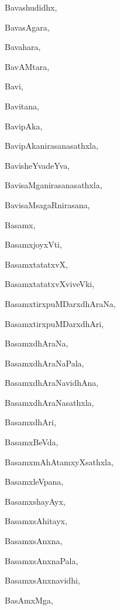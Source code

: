\begin{multicols}{2}
{Bavashudidhx}, \pageref{Bavashudidhx}

{BavasAgara}, \pageref{BavasAgara}

{Bavahara}, \pageref{Bavahara}

{BavAMtara}, \pageref{BavAMtara}

{Bavi}, \pageref{Bavi}

{Bavitana}, \pageref{Bavitana}

{BavipAka}, \pageref{BavipAka}

{BavipAkanirasanasathxla}, \pageref{BavipAkanirasanasathxla}

{BavisheYvadeYva}, \pageref{BavisheYvadeYva}

{BavisaMganirasanasathxla}, \pageref{BavisaMganirasanasathxla}

{BavisaMsagaRnirasana}, \pageref{BavisaMsagaRnirasana}

{Basamx}, \pageref{Basamx}

{BasamxjoyxVti}, \pageref{BasamxjoyxVti}

{BasamxtatatxvX}, \pageref{BasamxtatatxvX}

{BasamxtatatxvXviveVki}, \pageref{BasamxtatatxvXviveVki}

{BasamxtirxpuMDarxdhAraNa}, \pageref{BasamxtirxpuMDarxdhAraNa}

{BasamxtirxpuMDarxdhAri}, \pageref{BasamxtirxpuMDarxdhAri}

{BasamxdhAraNa}, \pageref{BasamxdhAraNa}

{BasamxdhAraNaPala}, \pageref{BasamxdhAraNaPala}

{BasamxdhAraNavidhAna}, \pageref{BasamxdhAraNavidhAna}

{BasamxdhAraNasathxla}, \pageref{BasamxdhAraNasathxla}

{BasamxdhAri}, \pageref{BasamxdhAri}

{BasamxBeVda}, \pageref{BasamxBeVda}

{BasamxmAhAtamxyXsathxla}, \pageref{BasamxmAhAtamxyXsathxla}

{BasamxleVpana}, \pageref{BasamxleVpana}

{BasamxshayAyx}, \pageref{BasamxshayAyx}

{BasamxsAhitayx}, \pageref{BasamxsAhitayx}

{BasamxsAnxna}, \pageref{BasamxsAnxna}

{BasamxsAnxnaPala}, \pageref{BasamxsAnxnaPala}

{BasamxsAnxnavidhi}, \pageref{BasamxsAnxnavidhi}

{BasAmxMga}, \pageref{BasAmxMga}


\end{multicols}
